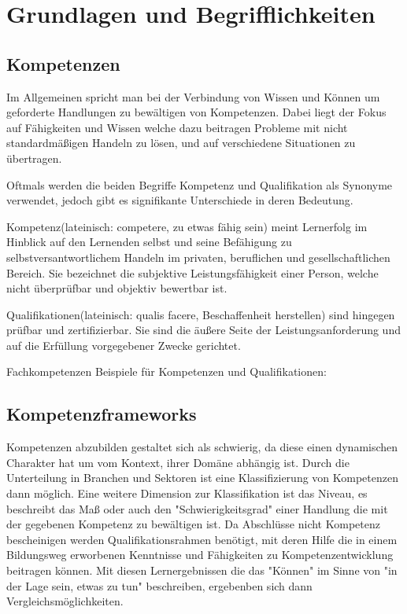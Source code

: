 \section{Grundlagen und Begrifflichkeiten}\label{2_grundlagen}


\subsection{Kompetenzen}\label{competencies}

Im Allgemeinen spricht man bei der Verbindung von Wissen und Können um geforderte Handlungen zu bewältigen von Kompetenzen. Dabei liegt der Fokus auf Fähigkeiten und Wissen welche dazu beitragen Probleme mit nicht standardmäßigen Handeln zu lösen, und auf verschiedene Situationen zu übertragen.\cite{bibb}

Oftmals werden die beiden Begriffe Kompetenz und Qualifikation als Synonyme verwendet, jedoch gibt es signifikante Unterschiede in deren Bedeutung. 
\vspace{1em}
 
Kompetenz(lateinisch: competere, zu etwas fähig sein) meint Lernerfolg im Hinblick auf den Lernenden selbst und seine Befähigung zu selbstversantwortlichem Handeln im privaten, beruflichen und gesellschaftlichen Bereich. Sie bezeichnet die subjektive Leistungsfähigkeit einer Person, welche nicht überprüfbar und objektiv bewertbar ist.

Qualifikationen(lateinisch: qualis facere, Beschaffenheit herstellen) sind hingegen prüfbar und zertifizierbar. Sie sind die äußere Seite der Leistungsanforderung und auf die Erfüllung vorgegebener Zwecke gerichtet. 
 
Fachkompetenzen
Beispiele für Kompetenzen und Qualifikationen:

\subsection{Kompetenzframeworks}

Kompetenzen abzubilden gestaltet sich als schwierig, da diese einen dynamischen Charakter hat um vom Kontext, ihrer Domäne abhängig ist. Durch die Unterteilung in Branchen und Sektoren ist eine Klassifizierung von Kompetenzen dann möglich. Eine weitere Dimension zur Klassifikation ist das Niveau, es beschreibt das Maß oder auch den "Schwierigkeitsgrad" einer Handlung die mit der gegebenen Kompetenz zu bewältigen ist. 
\vspace{1em}
Da Abschlüsse nicht Kompetenz bescheinigen werden Qualifikationsrahmen benötigt, mit deren Hilfe die in einem Bildungsweg erworbenen Kenntnisse und Fähigkeiten zu Kompetenzentwicklung beitragen können. Mit diesen Lernergebnissen die das "Können" im Sinne von "in der Lage sein, etwas zu tun" beschreiben, ergebenben sich dann Vergleichsmöglichkeiten.

